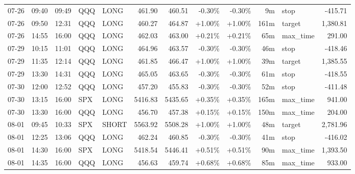 \documentclass[11pt,a4paper,twoside]{article}
\begin{document}
\begin{center}
\begin{longtable}{>{\color{txtmain}}l l l l l r r r r r >{\color{txtmain}}l r}
07-26 & 09:40 & 09:49 & QQQ & LONG & 461.90 & 460.51 & \textcolor{lossred}{-0.30\%} & \textcolor{lossred}{-0.30\%} & 9m & stop & \textcolor{lossred}{-415.71} \\
07-26 & 09:50 & 12:31 & QQQ & LONG & 460.27 & 464.87 & \textcolor{wingreen}{+1.00\%} & \textcolor{wingreen}{+1.00\%} & 161m & target & \textcolor{wingreen}{1,380.81} \\
07-26 & 14:55 & 16:00 & QQQ & LONG & 462.03 & 463.00 & \textcolor{wingreen}{+0.21\%} & \textcolor{wingreen}{+0.21\%} & 65m & max\_time & \textcolor{wingreen}{291.00} \\
07-29 & 10:15 & 11:01 & QQQ & LONG & 464.96 & 463.57 & \textcolor{lossred}{-0.30\%} & \textcolor{lossred}{-0.30\%} & 46m & stop & \textcolor{lossred}{-418.46} \\
07-29 & 11:35 & 12:14 & QQQ & LONG & 461.85 & 466.47 & \textcolor{wingreen}{+1.00\%} & \textcolor{wingreen}{+1.00\%} & 39m & target & \textcolor{wingreen}{1,385.55} \\
07-29 & 13:30 & 14:31 & QQQ & LONG & 465.05 & 463.65 & \textcolor{lossred}{-0.30\%} & \textcolor{lossred}{-0.30\%} & 61m & stop & \textcolor{lossred}{-418.55} \\
07-30 & 12:00 & 12:52 & QQQ & LONG & 457.20 & 455.83 & \textcolor{lossred}{-0.30\%} & \textcolor{lossred}{-0.30\%} & 52m & stop & \textcolor{lossred}{-411.48} \\
07-30 & 13:15 & 16:00 & SPX & LONG & 5416.83 & 5435.65 & \textcolor{wingreen}{+0.35\%} & \textcolor{wingreen}{+0.35\%} & 165m & max\_time & \textcolor{wingreen}{941.00} \\
07-30 & 13:30 & 16:00 & QQQ & LONG & 456.70 & 457.38 & \textcolor{wingreen}{+0.15\%} & \textcolor{wingreen}{+0.15\%} & 150m & max\_time & \textcolor{wingreen}{204.00} \\
08-01 & 09:45 & 10:33 & SPX & SHORT & 5563.92 & 5508.28 & \textcolor{wingreen}{+1.00\%} & \textcolor{wingreen}{+1.00\%} & 48m & target & \textcolor{wingreen}{2,781.96} \\
08-01 & 12:25 & 13:06 & QQQ & LONG & 462.24 & 460.85 & \textcolor{lossred}{-0.30\%} & \textcolor{lossred}{-0.30\%} & 41m & stop & \textcolor{lossred}{-416.02} \\
08-01 & 14:30 & 16:00 & SPX & LONG & 5418.54 & 5446.41 & \textcolor{wingreen}{+0.51\%} & \textcolor{wingreen}{+0.51\%} & 90m & max\_time & \textcolor{wingreen}{1,393.50} \\
08-01 & 14:35 & 16:00 & QQQ & LONG & 456.63 & 459.74 & \textcolor{wingreen}{+0.68\%} & \textcolor{wingreen}{+0.68\%} & 85m & max\_time & \textcolor{wingreen}{933.00} \\

\end{longtable}
\end{center}
\end{document}
